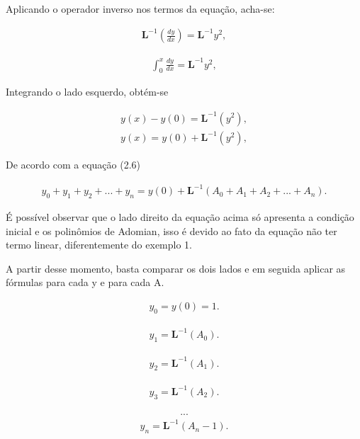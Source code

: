Aplicando o operador inverso nos termos da equação, acha-se:

\begin{gather*}
 \textbf{L}^{-1}\left(\frac{d y}{d x}\right) = \textbf{L}^{-1} y^2,
  \end{gather*}
  
  \begin{gather*}
  \int_0^{x}\frac{d y}{d x} = \textbf{L}^{-1} y^2,
\end{gather*} 

Integrando o lado esquerdo, obtém-se

\begin{gather*}
 y(x) - y(0) = \textbf{L}^{-1}(y^2),
\end{gather*} 
\begin{gather*}
 y(x)  = y(0) + \textbf{L}^{-1}(y^2),
\end{gather*}

De acordo com a equação (2.6)


\begin{gather*}
  y_{0} +y_{1} + y_{2} + ... + y_{n}  =  y(0) + \textbf{L}^{-1}( A_{0} +A_{1} + A_{2} + ... + A_{n}).
\end{gather*}
 
 É possível observar que o lado direito da equação acima só apresenta a condição inicial e os polinômios de Adomian, isso é devido ao fato da equação não ter termo linear, diferentemente do exemplo 1.
 
 A partir desse momento, basta comparar os dois lados e em seguida aplicar as fórmulas para cada y e para cada A.

\begin{gather*}
  y_{0} = y(0) = 1.
\end{gather*}

\begin{gather*}
  y_{1} = \textbf{L}^{-1} (A_{0}).
\end{gather*}

\begin{gather*}
  y_{2} = \textbf{L}^{-1} (A_{1}).
\end{gather*}

\begin{gather*}
  y_{3} = \textbf{L}^{-1} (A_{2}).
\end{gather*}

\begin{gather*}
  ...
\end{gather*}
\begin{gather*}
  y_{n} = \textbf{L}^{-1} (A_{n} - 1).
\end{gather*}

